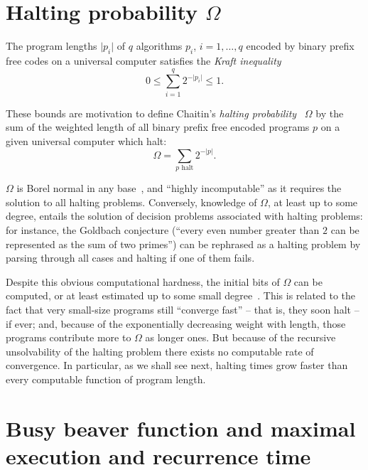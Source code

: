 \section{Halting probability $\Omega$}
\label{2016-pu-book-chapter-ranform-Omega}

The program lengths $\vert p_i \vert$ of $q$ algorithms $p_i$, $i=1,\ldots , q$ encoded by binary prefix free codes on a universal computer satisfies the
{\em Kraft inequality}
\begin{equation}
0 \le \sum_{i=1}^q 2^{ - \vert p_i \vert } \le 1.
\end{equation}

These bounds are motivation to define Chaitin's {\em halting probability}~\cite{ch:75,s00032-006-0064-2,chaitin-04}
$\Omega$
by the sum of the weighted length of all binary prefix free encoded programs $p$ on a given universal computer  which halt:
\begin{equation}
\Omega = \sum_{ p\textrm{ halt} } 2^{ - \vert p \vert }.
\end{equation}

$\Omega$ is
Borel normal in any base~\cite{chaitin:89},
and
``highly incomputable'' as it requires the solution to all halting problems. Conversely, knowledge of $\Omega$,
at least up to some degree, entails the solution of decision problems associated with halting problems:
for instance, the Goldbach conjecture
(``every even number greater than $2$ can be represented as the sum of two primes'')
can be rephrased as a halting problem by parsing through all cases and halting if one of them fails.

Despite this obvious computational hardness, the initial bits of $\Omega$
can be computed, or at least estimated up to some small degree~\cite{chaitin3,chaitin:01,2002-glimpseofran}.
This is related to the fact that very small-size programs still ``converge fast'' --
that is, they soon halt -- if ever; and, because of the exponentially decreasing weight with length,
those programs contribute more to $\Omega$ as longer ones.
But because of the recursive unsolvability of the halting problem there exists no computable rate of convergence.
In particular, as we shall see next, halting times grow faster than every computable function of program length.

\section{Busy beaver function and maximal execution and recurrence time}
\label{2016-pu-book-chapter-ranform-s-bb}

